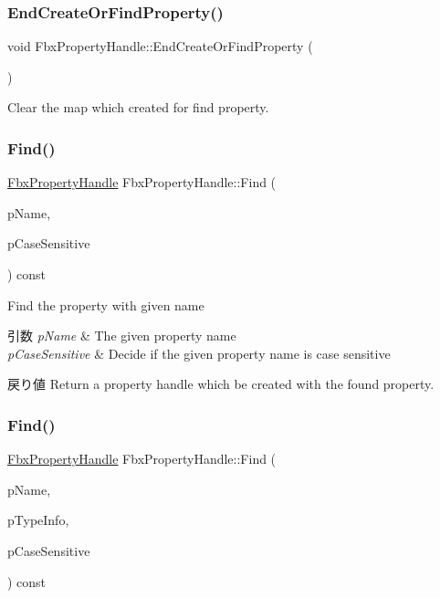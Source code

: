 \subsubsection{\texorpdfstring{End\+Create\+Or\+Find\+Property()}{EndCreateOrFindProperty()}}
{\footnotesize\ttfamily void Fbx\+Property\+Handle\+::\+End\+Create\+Or\+Find\+Property (\begin{DoxyParamCaption}{ }\end{DoxyParamCaption})}



Clear the map which created for find property. 

\mbox{\label{class_fbx_property_handle_a51b81ef0ee996b87dd832c6f99122437}} 
\subsubsection{\texorpdfstring{Find()}{Find()}\hspace{0.1cm}{\footnotesize\ttfamily [1/4]}}
{\footnotesize\ttfamily \hyperlink{class_fbx_property_handle}{Fbx\+Property\+Handle} Fbx\+Property\+Handle\+::\+Find (\begin{DoxyParamCaption}\item[{const char $\ast$}]{p\+Name,  }\item[{bool}]{p\+Case\+Sensitive }\end{DoxyParamCaption}) const}

Find the property with given name 
\begin{DoxyParams}{引数}
{\em p\+Name} & The given property name \\
\hline
{\em p\+Case\+Sensitive} & Decide if the given property name is case sensitive \\
\hline
\end{DoxyParams}
\begin{DoxyReturn}{戻り値}
Return a property handle which be created with the found property. 
\end{DoxyReturn}
\mbox{\label{class_fbx_property_handle_acda982c21cb2db55366500ff9da43322}} 
\subsubsection{\texorpdfstring{Find()}{Find()}\hspace{0.1cm}{\footnotesize\ttfamily [2/4]}}
{\footnotesize\ttfamily \hyperlink{class_fbx_property_handle}{Fbx\+Property\+Handle} Fbx\+Property\+Handle\+::\+Find (\begin{DoxyParamCaption}\item[{const char $\ast$}]{p\+Name,  }\item[{const \hyperlink{class_fbx_property_handle}{Fbx\+Property\+Handle} \&}]{p\+Type\+Info,  }\item[{bool}]{p\+Case\+Sensitive }\end{DoxyParamCaption}) const}


